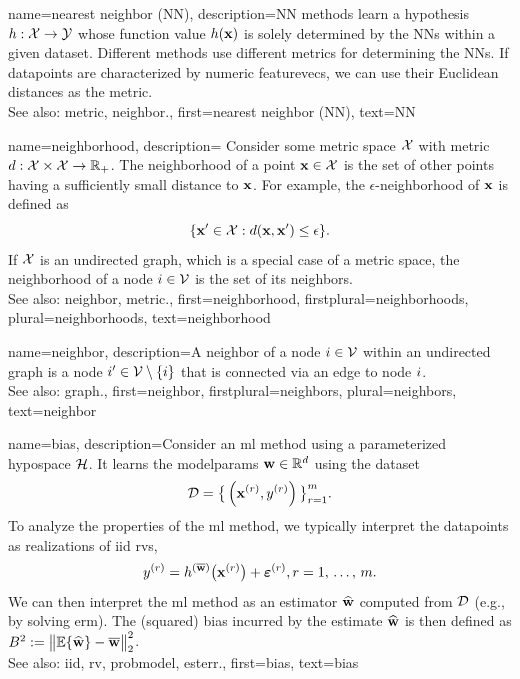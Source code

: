 {name={nearest neighbor (NN)},
	description={NN methods learn a \gls{hypothesis} 
		$h: \mathcal{X} \rightarrow \mathcal{Y}$ whose \gls{function} value $h({\bf x})$ 
		is solely determined by the NNs within a given \gls{dataset}. Different 
		methods use different \glspl{metric} for determining the NNs. If \glspl{datapoint} 
		are characterized by numeric \glspl{featurevec}, we can use their Euclidean distances as 
		the \gls{metric}.
					\\ 
		See also: \gls{metric}, \gls{neighbor}.},
	first={nearest neighbor (NN)},
	text={NN} 
}

 {name={neighborhood},
 	description={
 	Consider some \gls{metric} space $\mathcal{X}$ with \gls{metric} 
	$d: \mathcal{X} \times \mathcal{X} \rightarrow \mathbb{R}_{+}$.	
 	The neighborhood of a point ${\bf x} \in \mathcal{X}$ 
 	is the set of other points having a sufficiently small distance to ${\bf x}$. 
 	For example, the $\epsilon$-neighborhood of ${\bf x}$ is defined as
 	$$ \{ {\bf x}' \in \mathcal{X} : d({\bf x}, {\bf x}') \leq \epsilon \}.$$
	If $\mathcal{X}$ is an undirected \gls{graph}, which is a special case of 
 	a \gls{metric} space, the neighborhood of a node $i \in \mathcal{V}$ 
 	is the set of its \glspl{neighbor}.
 				\\ 
 	See also: \gls{neighbor}, \gls{metric}.},
 	first={neighborhood},
	firstplural={neighborhoods},
 	plural={neighborhoods},
 	text={neighborhood} 
 }


{name={neighbor},
	description={A neighbor of a node $i \in \mathcal{V}$ 
		within an undirected \gls{graph} is a node $i' \in \mathcal{V} \setminus \{ i\}$ 
		that is connected via an edge to node $i$.
				\\ 
		See also: \gls{graph}.},
	first={neighbor},
	firstplural={neighbors}, 
	plural={neighbors}, 
	text={neighbor} 
}

{name={bias},
	description={Consider an \gls{ml} method using a parameterized \gls{hypospace} $\mathcal{H}$. 
		It learns the \gls{modelparams} ${\bf w} \in \mathbb{R}^{d}$ using the \gls{dataset} 
		$$\mathcal{D}=\big\{ \left( {\bf x}^{(r)},y^{(r)} \right) \big\}_{r=1}^{m}.$$ 
		To analyze the properties of the \gls{ml} method, we typically interpret the \glspl{datapoint} as \glspl{realization} of \gls{iid} \glspl{rv}, 
		$$y^{(r)} = h^{(\overline{{\bf w}})}\big( {\bf x}^{(r)} \big) + \bm{\varepsilon}^{(r)}, r=1, \,\ldots, \,m.$$ 
		We can then interpret the \gls{ml} method as an estimator $\widehat{{\bf w}}$ 
		computed from $\mathcal{D}$ (e.g., by solving \gls{erm}). The (squared) bias incurred by 
		the estimate $\widehat{{\bf w}}$ is then defined as $B^{2} := \big\| \mathbb{E} \{ \widehat{{\bf w}}  \}- \overline{{\bf w}}\big\|_{2}^{2}$.
					\\ 
		See also: \gls{iid}, \gls{rv}, \gls{probmodel}, \gls{esterr}.},
	first={bias},
	text={bias} 
}

